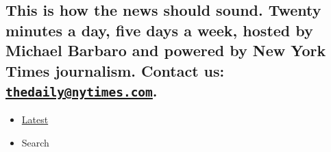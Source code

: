 \hypertarget{this-is-how-the-news-should-sound-twenty-minutes-a-day-five-days-a-week-hosted-by-michael-barbaro-and-powered-by-new-york-times-journalism-contact-us-thedailynytimescom-1}{%
\subsection{\texorpdfstring{This is how the news should sound. Twenty
minutes a day, five days a week, hosted by Michael Barbaro and powered
by New York Times journalism. Contact us:
\href{mailto:thedaily@nytimes.com}{\nolinkurl{thedaily@nytimes.com}}.}{This is how the news should sound. Twenty minutes a day, five days a week, hosted by Michael Barbaro and powered by New York Times journalism. Contact us: thedaily@nytimes.com.}}\label{this-is-how-the-news-should-sound-twenty-minutes-a-day-five-days-a-week-hosted-by-michael-barbaro-and-powered-by-new-york-times-journalism-contact-us-thedailynytimescom-1}}

\begin{itemize}
\tightlist
\item
  \protect\hyperlink{stream-panel}{Latest}
\item
  Search
\end{itemize}

